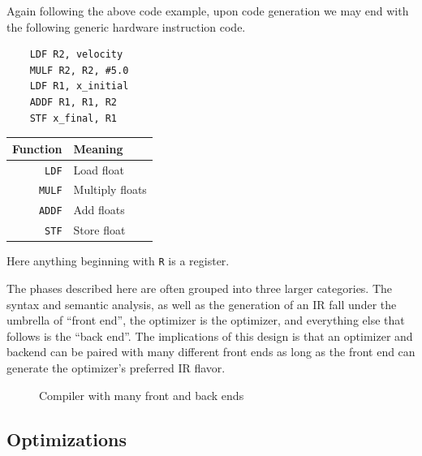 Again following the above code example, upon code generation we may end with the following generic hardware instruction code.

\begin{minipage}{0.5\textwidth}
    \begin{lstlisting}
    LDF R2, velocity
    MULF R2, R2, #5.0
    LDF R1, x_initial
    ADDF R1, R1, R2
    STF x_final, R1
\end{lstlisting}
\end{minipage}
\begin{minipage}{0.5\textwidth}
    \centering
    \begin{tabular}{rl}
        Function      & Meaning         \\ \toprule
        \texttt{LDF}  & Load float      \\
        \texttt{MULF} & Multiply floats \\
        \texttt{ADDF} & Add floats      \\
        \texttt{STF}  & Store float
    \end{tabular}
    \label{fig:machcode}
\end{minipage}
Here anything beginning with \texttt{R} is a register.

The phases described here are often grouped into three larger categories.
The syntax and semantic analysis, as well as the generation of an \ac{IR} fall under the umbrella of ``front end'', the optimizer is the optimizer, and everything else that follows is the ``back end''.
The implications of this design is that an optimizer and backend can be paired with many different front ends as long as the front end can generate the optimizer's preferred \ac{IR} flavor.
\begin{figure}[ht]
    \centering
    
    \caption{Compiler with many front and back ends}\label{fig:compends}
\end{figure}

\subsection{Optimizations}

